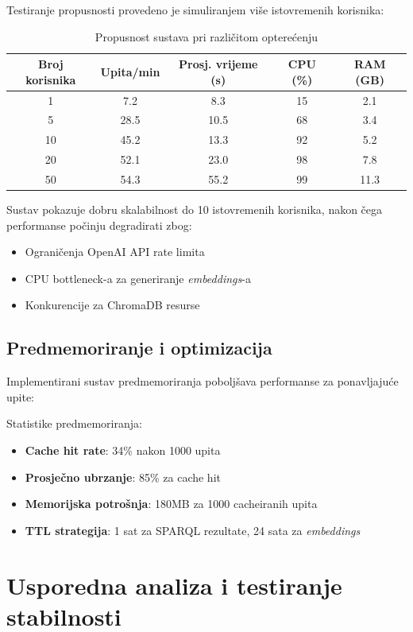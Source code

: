Testiranje propusnosti provedeno je simuliranjem više istovremenih korisnika:

\begin{table}[htbp]
\centering
\caption{Propusnost sustava pri različitom opterećenju}
\label{tab:throughput_analysis}
\begin{tabular}{|c|c|c|c|c|}
\hline
\textbf{Broj korisnika} & \textbf{Upita/min} & \textbf{Prosj. vrijeme (s)} & \textbf{CPU (\%)} & \textbf{RAM (GB)} \\
\hline
1 & 7.2 & 8.3 & 15 & 2.1 \\
5 & 28.5 & 10.5 & 68 & 3.4 \\
10 & 45.2 & 13.3 & 92 & 5.2 \\
20 & 52.1 & 23.0 & 98 & 7.8 \\
50 & 54.3 & 55.2 & 99 & 11.3 \\
\hline
\end{tabular}
\end{table}

Sustav pokazuje dobru skalabilnost do 10 istovremenih korisnika, nakon čega performanse počinju degradirati zbog:
\begin{itemize}
    \item Ograničenja OpenAI API rate limita
    \item CPU bottleneck-a za generiranje \textit{embeddings}-a
    \item Konkurencije za ChromaDB resurse
\end{itemize}

\subsection{Predmemoriranje i optimizacija}

Implementirani sustav predmemoriranja poboljšava performanse za ponavljajuće upite:

Statistike predmemoriranja:
\begin{itemize}
    \item \textbf{Cache hit rate}: 34\% nakon 1000 upita
    \item \textbf{Prosječno ubrzanje}: 85\% za cache hit
    \item \textbf{Memorijska potrošnja}: 180MB za 1000 cacheiranih upita
    \item \textbf{TTL strategija}: 1 sat za SPARQL rezultate, 24 sata za \textit{embeddings}
\end{itemize}

\section{Usporedna analiza i testiranje stabilnosti}

